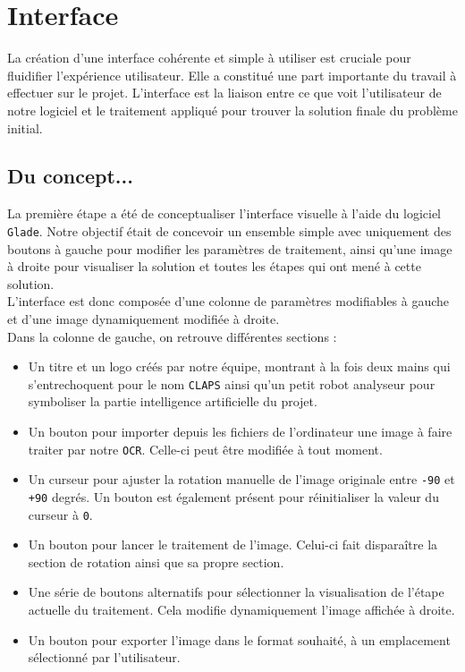 \documentclass{article}
\begin{document}
\section{Interface}
La création d'une interface cohérente et simple à utiliser est cruciale pour fluidifier l'expérience utilisateur. Elle a constitué une part importante du travail à effectuer sur le projet. L'interface est la liaison entre ce que voit l'utilisateur de notre logiciel et le traitement appliqué pour trouver la solution finale du problème initial.\\

\subsection{Du concept...}
La première étape a été de conceptualiser l'interface visuelle à l'aide du logiciel \texttt{Glade}. Notre objectif était de concevoir un ensemble simple avec uniquement des boutons à gauche pour modifier les paramètres de traitement, ainsi qu'une image à droite pour visualiser la solution et toutes les étapes qui ont mené à cette solution.\\

L'interface est donc composée d'une colonne de paramètres modifiables à gauche et d'une image dynamiquement modifiée à droite.\\

Dans la colonne de gauche, on retrouve différentes sections :
\begin{itemize}
    \item Un titre et un logo créés par notre équipe, montrant à la fois deux mains qui s'entrechoquent pour le nom \texttt{CLAPS} ainsi qu'un petit robot analyseur pour symboliser la partie intelligence artificielle du projet.
    \item Un bouton pour importer depuis les fichiers de l'ordinateur une image à faire traiter par notre \texttt{OCR}. Celle-ci peut être modifiée à tout moment.
    \item Un curseur pour ajuster la rotation manuelle de l'image originale entre \texttt{-90} et \texttt{+90} degrés. Un bouton est également présent pour réinitialiser la valeur du curseur à \texttt{0}.
    \item Un bouton pour lancer le traitement de l'image. Celui-ci fait disparaître la section de rotation ainsi que sa propre section.
    \item Une série de boutons alternatifs pour sélectionner la visualisation de l'étape actuelle du traitement. Cela modifie dynamiquement l'image affichée à droite.
    \item Un bouton pour exporter l'image dans le format souhaité, à un emplacement sélectionné par l'utilisateur.\\
\end{itemize}
\end{document}
